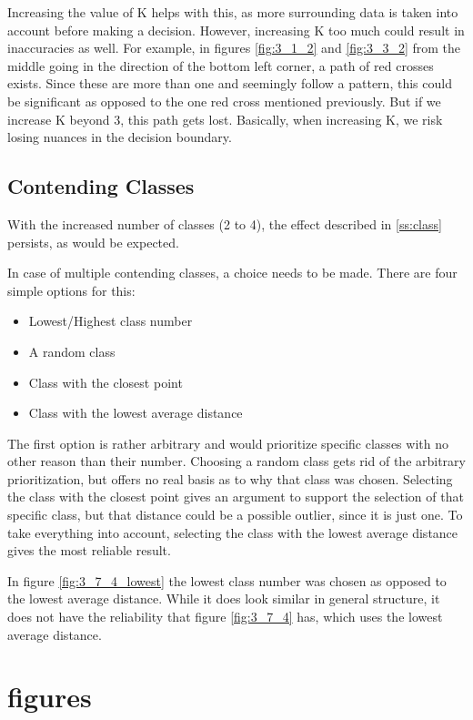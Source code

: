 \documentclass[10pt,a4paper]{article}
\begin{document}
{Increasing the value of K helps with this, as more surrounding data is taken into account before making a decision. However, increasing K too much could result in inaccuracies as well. For example, in figures \ref{fig:3_1_2} and \ref{fig:3_3_2} from the middle going in the direction of the bottom left corner, a path of red crosses exists. Since these are more than one and seemingly follow a pattern, this could be significant as opposed to the one red cross mentioned previously. But if we increase K beyond 3, this path gets lost. Basically, when increasing K, we risk losing nuances in the decision boundary.

\subsection{Contending Classes}
With the increased number of classes (2 to 4), the effect described in \ref{ss:class} persists, as would be expected.

In case of multiple contending classes, a choice needs to be made. There are four simple options for this:
\begin{itemize}
\item Lowest/Highest class number
\item A random class
\item Class with the closest point
\item Class with the lowest average distance
\end{itemize}

The first option is rather arbitrary and would prioritize specific classes with no other reason than their number. Choosing a random class gets rid of the arbitrary prioritization, but offers no real basis as to why that class was chosen.
Selecting the class with the closest point gives an argument to support the selection of that specific class, but that distance could be a possible outlier, since it is just one. To take everything into account, selecting the class with the lowest average distance gives the most reliable result.

In figure \ref{fig:3_7_4_lowest} the lowest class number was chosen as opposed to the lowest average distance. While it does look similar in general structure, it does not have the reliability that figure \ref{fig:3_7_4} has, which uses the lowest average distance.

\appendix
\section{figures}
}
\end{document}

